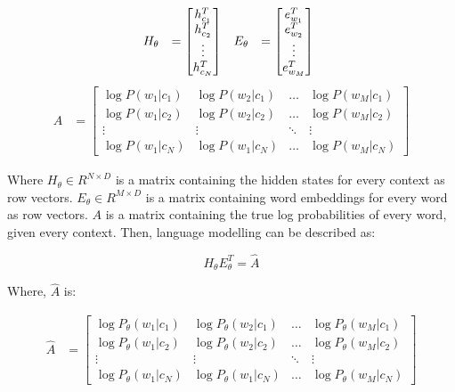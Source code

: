 \begin{displaymath}
    \begin{matrix}
        H_\theta &= \begin{bmatrix}
               h^T_{c_1} \\
               h^T_{c_2} \\
               \vdots \\
               h^T_{c_N}
              \end{bmatrix}
        &     
        E_\theta &= \begin{bmatrix}
           e^T_{w_1} \\
           e^T_{w_2} \\
           \vdots \\
           e^T_{w_M}
          \end{bmatrix}
    \end{matrix} \\
\end{displaymath}
\begin{displaymath}
    \begin{matrix}
    A &= \begin{bmatrix}
       \log P(w_1 | c_1) & \log P(w_2 | c_1) & \hdots & \log P(w_M | c_1)  \\
       \log P(w_1 | c_2) & \log P(w_2 | c_2) & \hdots & \log P(w_M | c_2) \\
       \vdots & \vdots & \ddots & \vdots \\
       \log P(w_1 | c_N) & \log P(w_1 | c_N) & \hdots & \log P(w_M | c_N)
      \end{bmatrix}
    \end{matrix}
\end{displaymath}

Where $ H_\theta \in R^{N \times D} $ is a matrix containing the hidden states for every context as row vectors. $ E_\theta \in R^{M \times D}$ is a matrix containing word embeddings for every word as row vectors. $ A $ is a matrix containing the true log probabilities of every word, given every context. Then, language modelling can be described as:

\begin{displaymath}
    H_\theta E^T_\theta = \hat A
\end{displaymath}

Where, $ \hat A $ is:

\begin{displaymath}
    \begin{matrix}
    \hat A &= \begin{bmatrix}
       \log P_\theta(w_1 | c_1) & \log P_\theta(w_2 | c_1) & \hdots & \log P_\theta(w_M | c_1)  \\
       \log P_\theta(w_1 | c_2) & \log P_\theta(w_2 | c_2) & \hdots & \log P_\theta(w_M | c_2) \\
       \vdots & \vdots & \ddots & \vdots \\
       \log P_\theta(w_1 | c_N) & \log P_\theta(w_1 | c_N) & \hdots & \log P_\theta(w_M | c_N)
      \end{bmatrix}
    \end{matrix}
\end{displaymath}

